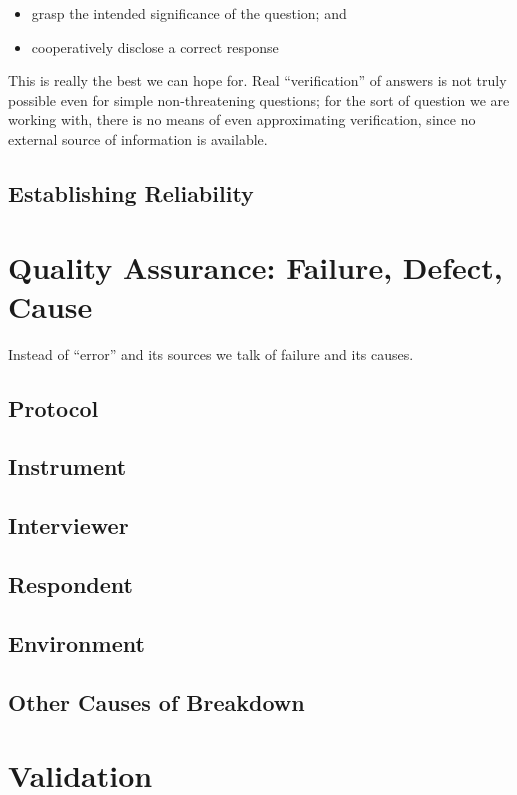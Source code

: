 \documentclass[11pt,twoside]{article}
\begin{document}
\begin{itemize}
\item grasp the intended significance of the question; and
\item cooperatively disclose a correct response
\end{itemize}

This is really the best we can hope for.  Real \enquote{verification} of
answers is not truly possible even for simple non-threatening
questions; for the sort of question we are working with, there is no
means of even approximating verification, since no external source of
information is available.

\subsection{Establishing Reliability}

\section{Quality Assurance: Failure, Defect, Cause}

Instead of \enquote{error} and its sources we talk of failure and its
causes.

\subsection{Protocol}
\subsection{Instrument}
\subsection{Interviewer}
\subsection{Respondent}
\subsection{Environment}
\subsection{Other Causes of Breakdown}

\section{Validation}
\end{document}
